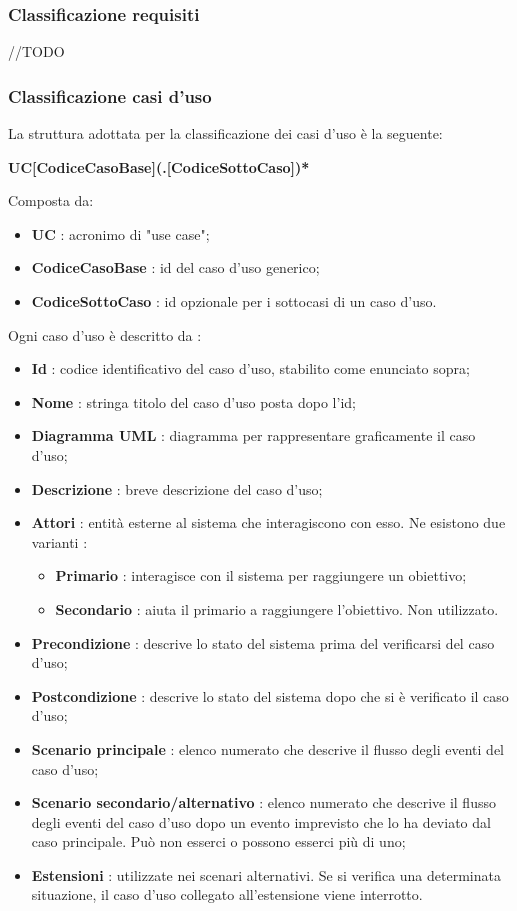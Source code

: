 \subsubsection{Classificazione requisiti}
//TODO

\subsubsection{Classificazione casi d'uso}
La struttura adottata per la classificazione dei casi d'uso è la seguente: \\
\centerline{\textbf{UC[CodiceCasoBase](.[CodiceSottoCaso])*}}
Composta da:
\begin{itemize}
\item \textbf{UC} : acronimo di "use case";
\item \textbf{CodiceCasoBase} : id del caso d'uso generico;
\item \textbf{CodiceSottoCaso} : id opzionale per i sottocasi di un caso d'uso.
\end{itemize}

Ogni caso d'uso è descritto da : 
\begin{itemize}
    \item \textbf{Id} : codice identificativo del caso d'uso, stabilito come enunciato sopra;
    \item \textbf{Nome} : stringa titolo del caso d'uso posta dopo l'id;
    \item \textbf{Diagramma UML} : diagramma per rappresentare graficamente il caso d'uso;
    \item \textbf{Descrizione} : breve descrizione del caso d'uso;
    \item \textbf{Attori} : entità esterne al sistema che interagiscono con esso. Ne esistono due varianti : 
    \begin{itemize}
    \item \textbf{Primario} : interagisce con il sistema per raggiungere un obiettivo;
    \item \textbf{Secondario} : aiuta il primario a raggiungere l'obiettivo. Non utilizzato.
    \end{itemize}
    \item \textbf{Precondizione} : descrive lo stato del sistema prima del verificarsi del caso d'uso;
    \item \textbf{Postcondizione} : descrive lo stato del sistema dopo che si è verificato il caso d'uso;
    \item \textbf{Scenario principale} : elenco numerato che descrive il flusso degli eventi del caso d'uso;
    \item \textbf{Scenario secondario/alternativo} : elenco numerato che descrive il flusso degli eventi del caso d'uso dopo un evento imprevisto che lo ha deviato dal caso principale. Può non esserci o possono esserci più di uno;
    \item \textbf{Estensioni} : utilizzate nei scenari alternativi. Se si verifica una determinata situazione, il caso d'uso collegato all'estensione viene interrotto.
\end{itemize}




